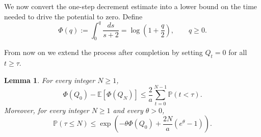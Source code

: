 \documentclass[11pt,reqno,letterpaper]{amsart}
\newtheorem{lemma}[theorem]{Lemma}
\theoremstyle{definition}
\numberwithin{equation}{section}
\newcommand{\E}{\mathbb{E}}
\renewcommand{\P}{\mathbb{P}}
\begin{document}
We now convert the one-step decrement estimate into a lower bound on the time
needed to drive the potential to zero.  Define
\[
\Phi(q):=\int_0^q \frac{ds}{s+2}
=
\log\left(1+\frac q2\right),
\qquad q\ge0.
\]

From now on we extend the process after completion by setting \(Q_t=0\) for all \(t\ge \tau\).

\begin{lemma}\label{lem:phi-progress}
For every integer
\(N\ge1\),
\begin{equation}\label{eq:finite-progress-expectation}
\Phi(Q_0)-\E[\Phi(Q_N)]
\le
\frac2a\sum_{t=0}^{N-1}\P(t<\tau).
\end{equation}
Moreover, for every integer \(N\ge1\) and every \(\theta>0\),
\begin{equation}\label{eq:finite-progress-tail}
\P(\tau\le N)
\le
\exp\left(
-\theta\Phi(Q_0)
+
\frac{2N}{a}(e^\theta-1)
\right).
\end{equation}
\end{lemma}
\end{document}
